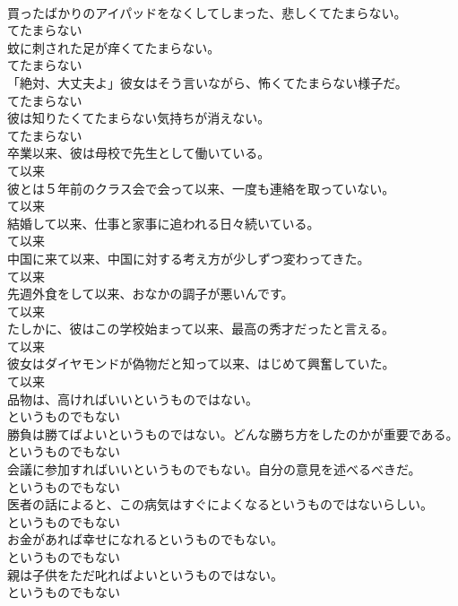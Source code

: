 \documentclass[8pt]{extreport}
\begin{document}
\begin{CJK}{UTF8}{min}
\\	買ったばかりのアイパッドをなくしてしまった、悲しくてたまらない。	
\\	てたまらない
\\	蚊に刺された足が痒くてたまらない。	
\\	てたまらない
\\	「絶対、大丈夫よ」彼女はそう言いながら、怖くてたまらない様子だ。	
\\	てたまらない
\\	彼は知りたくてたまらない気持ちが消えない。	
\\	てたまらない
\\	卒業以来、彼は母校で先生として働いている。	
\\	て以来
\\	彼とは５年前のクラス会で会って以来、一度も連絡を取っていない。	
\\	て以来
\\	結婚して以来、仕事と家事に追われる日々続いている。	
\\	て以来
\\	中国に来て以来、中国に対する考え方が少しずつ変わってきた。	
\\	て以来
\\	先週外食をして以来、おなかの調子が悪いんです。	
\\	て以来
\\	たしかに、彼はこの学校始まって以来、最高の秀才だったと言える。	
\\	て以来
\\	彼女はダイヤモンドが偽物だと知って以来、はじめて興奮していた。	
\\	て以来
\\	品物は、高ければいいというものではない。	
\\	というものでもない
\\	勝負は勝てばよいというものではない。どんな勝ち方をしたのかが重要である。	
\\	というものでもない
\\	会議に参加すればいいというものでもない。自分の意見を述べるべきだ。	
\\	というものでもない
\\	医者の話によると、この病気はすぐによくなるというものではないらしい。	
\\	というものでもない
\\	お金があれば幸せになれるというものでもない。	
\\	というものでもない
\\	親は子供をただ叱ればよいというものではない。	
\\	というものでもない

\end{CJK}
\end{document}
